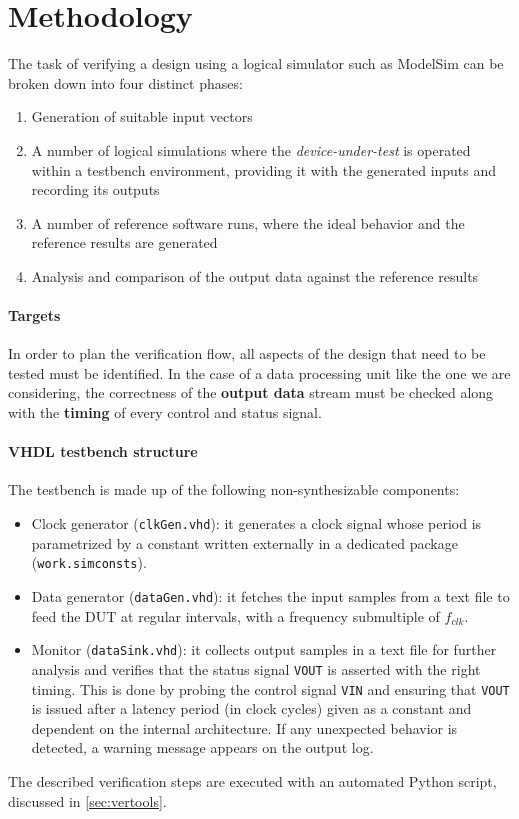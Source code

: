 \section{Methodology}
The task of verifying a design using a logical simulator such as ModelSim can be broken down into four distinct phases:
\begin{enumerate}
    \item Generation of suitable input vectors
    \item A number of logical simulations where the \textit{device-under-test} is operated within a testbench environment, providing it with the generated inputs and recording its outputs
    \item A number of reference software runs, where the ideal behavior and the reference results are generated
    \item Analysis and comparison of the output data against the reference results
\end{enumerate}

\paragraph{Targets} In order to plan the verification flow, all aspects of the design that need to be tested must be identified. In the case of a data processing unit like the one we are considering, the correctness of the \textbf{output data} stream must be checked along with the \textbf{timing} of every control and status signal.

\paragraph{VHDL testbench structure} The testbench is made up of the following non-synthesizable components:
\begin{itemize}
	\item Clock generator (\texttt{clkGen.vhd}): it generates a clock signal whose period is parametrized by a constant written externally in a dedicated package (\texttt{work.simconsts}).
	\item Data generator (\texttt{dataGen.vhd}): it fetches the input samples from a text file to feed the DUT at regular intervals, with a frequency submultiple of $f_{clk}$.
	\item Monitor (\texttt{dataSink.vhd}): it collects output samples in a text file for further analysis and verifies that the status signal \texttt{VOUT} is asserted with the right timing. This is done by probing the control signal \texttt{VIN} and ensuring that \texttt{VOUT} is issued after a latency period (in clock cycles) given as a constant and dependent on the internal architecture. If any unexpected behavior is detected, a warning message appears on the output log.
\end{itemize}

The described verification steps are executed with an automated Python script, discussed in \autoref{sec:vertools}.
